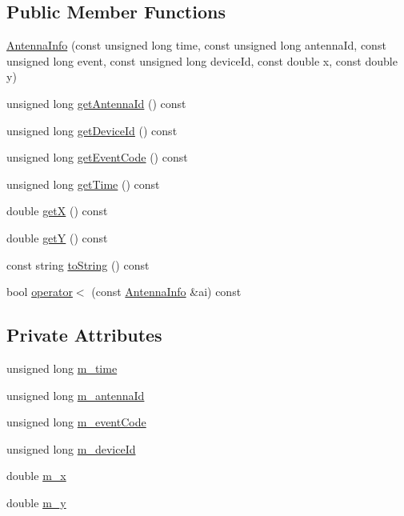 \subsection*{Public Member Functions}
\begin{DoxyCompactItemize}
\item 
\hyperlink{class_antenna_info_a1009059d8b7a6907c7e886af95fe7d9c}{Antenna\+Info} (const unsigned long time, const unsigned long antenna\+Id, const unsigned long event, const unsigned long device\+Id, const double x, const double y)
\item 
unsigned long \hyperlink{class_antenna_info_a1aee619b1f3d45e3da945f17d8531bbf}{get\+Antenna\+Id} () const
\item 
unsigned long \hyperlink{class_antenna_info_a25a6a3ca6afeba45c00f2312b8d2d9de}{get\+Device\+Id} () const
\item 
unsigned long \hyperlink{class_antenna_info_a898d46ed6fd2676e370ae8c325ffd679}{get\+Event\+Code} () const
\item 
unsigned long \hyperlink{class_antenna_info_aaae1e1105ba4a724c0061e3f7904b1e5}{get\+Time} () const
\item 
double \hyperlink{class_antenna_info_a3817cba0231888dc5977105ace0faddb}{getX} () const
\item 
double \hyperlink{class_antenna_info_aa385e3e85d783b81d69014a64b5fc94f}{getY} () const
\item 
const string \hyperlink{class_antenna_info_ae1ba7432ca7aef9a4f79a422ee195a58}{to\+String} () const
\item 
bool \hyperlink{class_antenna_info_a74156652eb5ad9a62f41fea726e33b40}{operator$<$} (const \hyperlink{class_antenna_info}{Antenna\+Info} \&ai) const
\end{DoxyCompactItemize}
\subsection*{Private Attributes}
\begin{DoxyCompactItemize}
\item 
unsigned long \hyperlink{class_antenna_info_a355d929c83040e154f635ce149286b05}{m\+\_\+time}
\item 
unsigned long \hyperlink{class_antenna_info_a7776748da0e4d9f4b39683066806a897}{m\+\_\+antenna\+Id}
\item 
unsigned long \hyperlink{class_antenna_info_a90e054e1eb790e6b0096bf35a27bbd8e}{m\+\_\+event\+Code}
\item 
unsigned long \hyperlink{class_antenna_info_a006ef0511686a6874503ff398b6bf7e8}{m\+\_\+device\+Id}
\item 
double \hyperlink{class_antenna_info_a80e006159e01abca28d465e80b327992}{m\+\_\+x}
\item 
double \hyperlink{class_antenna_info_a3a9ec27d75b8d2f0d750d64b7a2a3069}{m\+\_\+y}
\end{DoxyCompactItemize}



